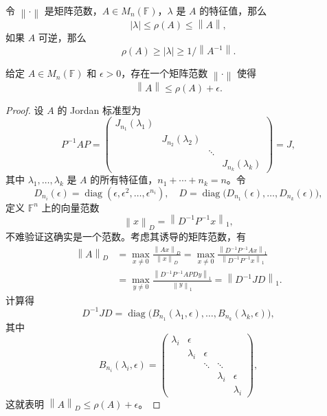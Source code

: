 \documentclass[fontset=none,zihao=-4]{Notes}
\DeclareMathOperator\diag{diag}
\newcommand{\norm}[1]{\left\lVert#1\right\rVert}
\begin{document}
\begin{theorem}\label{thm:upper bound of rho}
  令 $\norm{\cdot}$ 是矩阵范数，$A\in M_n(\mathbb{F})$，$\lambda$ 是 $A$
  的特征值，那么
  \[
    |\lambda|\leq\rho(A)\leq\norm{A},  
  \]
  如果 $A$ 可逆，那么
  \[
    \rho(A)\geq |\lambda|\geq1/\norm{A^{-1}}.  
  \]
\end{theorem}

\begin{theorem}\label{thm:matrix norm can close to rho}
  给定 $A\in M_n(\mathbb{F})$ 和 $\epsilon>0$，存在一个矩阵范数 $\norm{\cdot}$
  使得
  \[
    \norm{A}\leq \rho(A)+\epsilon.  
  \]
\end{theorem}
\begin{proof}
  设 $A$ 的 Jordan 标准型为
  \[
    P^{-1}A{P}=\begin{pmatrix}
      J_{n_1}(\lambda_1) \\
      & J_{n_2}(\lambda_2) \\
      & & \ddots \\
      & & & J_{n_k}(\lambda_k)
    \end{pmatrix} =J ,
  \]
  其中 $\lambda_1,\dots,\lambda_k$ 是 $A$ 的所有特征值，$n_1+\cdots+n_k=n$。令
  \[
    D_{n_i}(\epsilon)=\diag(\epsilon,\epsilon^2,\dots,\epsilon^{n_i}),  
    \quad D=\diag\bigl(D_{n_1}(\epsilon),\dots,D_{n_k}(\epsilon)\bigr),
  \]
  定义 $\mathbb{F}^n$ 上的向量范数
  \[
    \norm{x}_D=\norm{D^{-1}P^{-1}x}_{1},  
  \]
  不难验证这确实是一个范数。考虑其诱导的矩阵范数，有
  \begin{align*}
    \norm{A}_D&=\max_{x\neq 0}\frac{\norm{Ax}_D}{\norm{x}_D}
    =\max_{x\neq 0}\frac{\norm{D^{-1}P^{-1}Ax}_1}{\norm{D^{-1}P^{-1}x}_1}\\
    &=\max_{y\neq 0}\frac{\norm{D^{-1}P^{-1}APDy}_1}{\norm{y}_1}=\norm{D^{-1}JD}_1.
  \end{align*}
  计算得
  \[
    D^{-1}JD= \diag\bigl(B_{n_1}(\lambda_1,\epsilon),\dots,B_{n_k}(\lambda_k,\epsilon)\bigr),
  \]
  其中
  \[
    B_{n_i}(\lambda_i,\epsilon)=\begin{pmatrix}
      \lambda_i & \epsilon \\
      & \lambda_i & \epsilon \\
      & & \ddots & \ddots \\
      & & & \lambda_i & \epsilon \\
      & & & & \lambda_i
    \end{pmatrix}  ,
  \]
  这就表明 $\norm{A}_D\leq \rho(A)+\epsilon$。
\end{proof}
\end{document}
